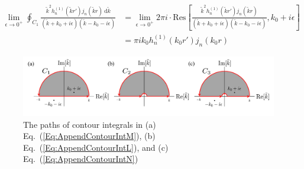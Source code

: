 \documentclass[journal=jacsat,manuscript=article,layout=traditional]{achemso}
\newcommand*\diff{\mathrm{d}}
\begin{document}
\begin{appendix}
\begin{align}
    \nonumber
    \lim_{\epsilon\rightarrow 0^+}\oint_{C_1} \frac{\tilde{k}^2
    h_n^{(1)}(\tilde{k}r')j_n(\tilde{k}r)~\diff{\tilde{k}}}
    {(\tilde{k}+k_0+i\epsilon)(\tilde{k}-k_0-i\epsilon)}
    &=\lim_{\epsilon\rightarrow 0^+}2\pi i\cdot\mathrm{Res}\left[
    \frac{\tilde{k}^2
    h_n^{(1)}(\tilde{k}r')j_n(\tilde{k}r)}
    {(\tilde{k}+k_0+i\epsilon)(\tilde{k}-k_0-i\epsilon)}
    ,k_0+i\epsilon\right]\\
    &=\pi ik_0
    h_n^{(1)}(k_0r')j_n(k_0r)
\end{align}
\begin{figure}[!ht]
    \begin{center}
    \includegraphics[width=1\textwidth]{Figures/LMNcontour.pdf}
    \caption{The paths of contour integrals in (a) Eq.~(\ref{Eq:AppendContourIntM}), (b) Eq.~(\ref{Eq:AppendContourIntL}), and (c)
    Eq.~(\ref{Eq:AppendContourIntN})}
    \label{Contour}
    \end{center}
\end{figure}


\end{appendix}
\end{document}
